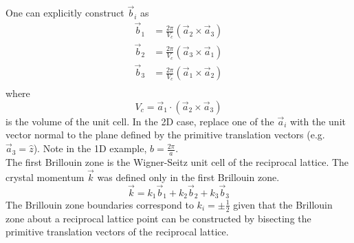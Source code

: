 \documentclass[12pt,a4paper,titlepage]{article}
\begin{document}
One can explicitly construct $\vec{b}_{i}$ as
\begin{equation}
\begin{aligned}
\vec{b}_{1}&=\frac{2\pi}{V_{c}}(\vec{a}_{2}\times\vec{a}_{3})\\
\vec{b}_{2}&=\frac{2\pi}{V_{c}}(\vec{a}_{3}\times\vec{a}_{1})\\
\vec{b}_{3}&=\frac{2\pi}{V_{c}}(\vec{a}_{1}\times\vec{a}_{2})\\
\end{aligned}
\end{equation}
where
\begin{equation}
V_{c}=\vec{a}_{1}\cdot(\vec{a}_{2}\times\vec{a}_{3})
\end{equation}
is the volume of the unit cell. In the 2D case, replace one of the $\vec{a}_{i}$ with the unit vector normal to the plane defined by the primitive translation vectors (e.g. $\vec{a}_{3}=\hat{z}$). Note in the 1D example, $b=\frac{2\pi}{a}$.\\

The first Brillouin zone is the Wigner-Seitz unit cell of the reciprocal lattice. The crystal momentum $\vec{k}$ was defined only in the first Brillouin zone.
\begin{equation}
\vec{k}=k_{1}\vec{b}_{1}+k_{2}\vec{b}_{2}+k_{3}\vec{b}_{3}
\end{equation}
The Brillouin zone boundaries correspond to $k_{i}=\pm\frac{1}{2}$ given that the Brillouin zone about a reciprocal lattice point can be constructed by bisecting the primitive translation vectors of the reciprocal lattice.\\
\end{document}
